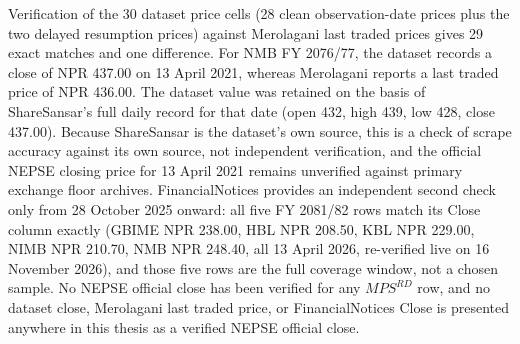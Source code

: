 Verification of the 30 dataset price cells (28 clean observation-date prices plus the two delayed resumption prices) against Merolagani last traded prices gives 29 exact matches and one difference. For NMB FY 2076/77, the dataset records a close of NPR 437.00 on 13 April 2021, whereas Merolagani reports a last traded price of NPR 436.00. The dataset value was retained on the basis of ShareSansar's full daily record for that date (open 432, high 439, low 428, close 437.00). Because ShareSansar is the dataset's own source, this is a check of scrape accuracy against its own source, not independent verification, and the official NEPSE closing price for 13 April 2021 remains unverified against primary exchange floor archives. FinancialNotices provides an independent second check only from 28 October 2025 onward: all five FY 2081/82 rows match its Close column exactly (GBIME NPR 238.00, HBL NPR 208.50, KBL NPR 229.00, NIMB NPR 210.70, NMB NPR 248.40, all 13 April 2026, re-verified live on 16 November 2026), and those five rows are the full coverage window, not a chosen sample. No NEPSE official close has been verified for any $\mathit{MPS}^{RD}$ row, and no dataset close, Merolagani last traded price, or FinancialNotices Close is presented anywhere in this thesis as a verified NEPSE official close.

